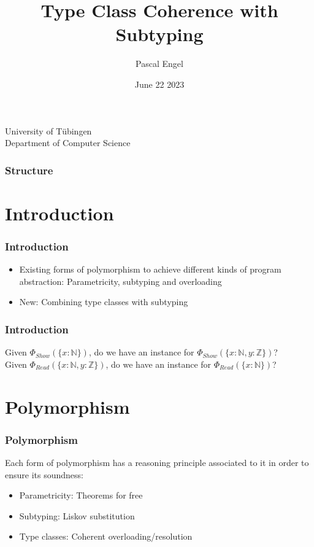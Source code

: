 \documentclass{beamer}
\title{Type Class Coherence with Subtyping}
\author{Pascal Engel}
\date{June 22 2023}
\newcommand\Nat{\mathbb{N}}
\newcommand\Int{\mathbb{Z}}
\begin{document}
\begin{frame}
  \centering
  University of T\"ubingen\\
  Department of Computer Science\\
  \maketitle
\end{frame}

\begin{frame}
  \frametitle{Structure}
  \tableofcontents
\end{frame}

\section{Introduction}

\begin{frame}
  \frametitle{Introduction}

  \begin{itemize}
    \item Existing forms of polymorphism to achieve different kinds of program abstraction: Parametricity, subtyping and overloading
    \item New: Combining type classes with subtyping
  \end{itemize}
\end{frame}

\begin{frame}
  \frametitle{Introduction}

  Given $\Phi_{\mathit{Show}}(\{ x : \Nat \})$, do we have an instance for $\Phi_{\mathit{Show}}(\{ x : \Nat, y : \Int \})$?
  \\

  \pause
  Given $\Phi_{\mathit{Read}}(\{ x : \Nat, y : \Int \})$, do we have an instance for  $\Phi_{\mathit{Read}}(\{ x : \Nat \})$?
\end{frame}

\section{Polymorphism}

\begin{frame}
  \frametitle{Polymorphism}

  Each form of polymorphism has a reasoning principle associated to it in order to ensure its soundness:
  \begin{itemize}
    \item Parametricity: Theorems for free \cite{wadlertheorems}
    \item Subtyping: Liskov substitution \cite{liskov}
    \item Type classes: Coherent overloading/resolution \cite{reynolds_coherence}
  \end{itemize}
\end{frame}
\end{document}
